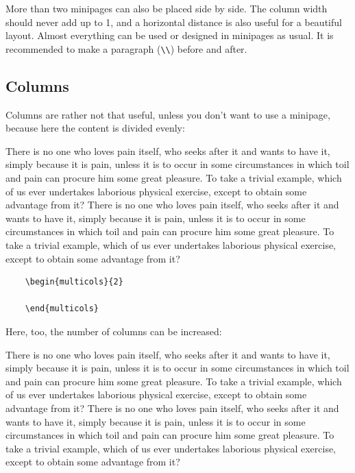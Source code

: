 More than two minipages can also be placed side by side. The column width should never add up to 1, and a horizontal distance is also useful for a beautiful layout. Almost everything can be used or designed in minipages as usual. It is recommended to make a paragraph (\verb|\\|) before and after.


\subsection{Columns}

Columns are rather not that useful, unless you don't want to use a minipage, because here the content is divided evenly:

\begin{multicols}{2}
	There is no one who loves pain itself, who seeks after it and wants to have it, simply because it is pain, unless it is to occur in some circumstances in which toil and pain can procure him some great pleasure. To take a trivial example, which of us ever undertakes laborious physical exercise, except to obtain some advantage from it? There is no one who loves pain itself, who seeks after it and wants to have it, simply because it is pain, unless it is to occur in some circumstances in which toil and pain can procure him some great pleasure. To take a trivial example, which of us ever undertakes laborious physical exercise, except to obtain some advantage from it?
\end{multicols}

\begin{verbatim}
    \begin{multicols}{2}
    	
    \end{multicols}
\end{verbatim}

Here, too, the number of columns can be increased:

\begin{multicols}{3}
	There is no one who loves pain itself, who seeks after it and wants to have it, simply because it is pain, unless it is to occur in some circumstances in which toil and pain can procure him some great pleasure. To take a trivial example, which of us ever undertakes laborious physical exercise, except to obtain some advantage from it? There is no one who loves pain itself, who seeks after it and wants to have it, simply because it is pain, unless it is to occur in some circumstances in which toil and pain can procure him some great pleasure. To take a trivial example, which of us ever undertakes laborious physical exercise, except to obtain some advantage from it?
\end{multicols}


